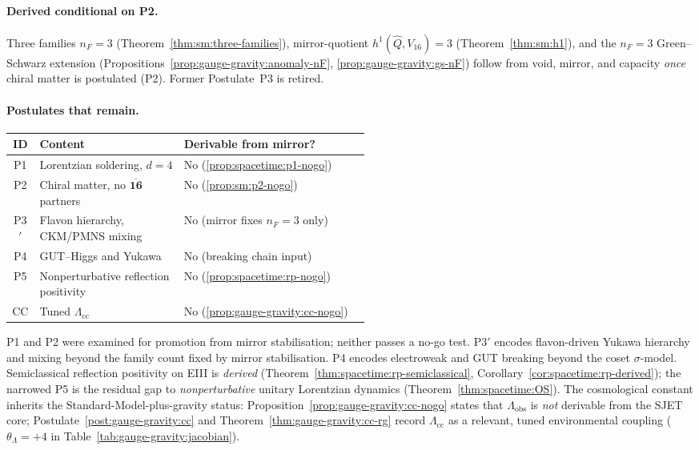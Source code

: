 \paragraph{Derived conditional on P2.}
Three families $n_F=3$ (Theorem~\ref{thm:sm:three-families}), mirror-quotient
$h^1(\hat Q,V_{16})=3$ (Theorem~\ref{thm:sm:h1}), and the $n_F=3$ Green--Schwarz
extension (Propositions~\ref{prop:gauge-gravity:anomaly-nF},
\ref{prop:gauge-gravity:gs-nF}) follow from void, mirror, and capacity
\emph{once} chiral matter is postulated (P2). Former Postulate~P3 is retired.

\paragraph{Postulates that remain.}
\begin{center}
\small
\renewcommand{\arraystretch}{1.1}
\begin{tabular}{@{}clp{0.52\linewidth}@{}}
\toprule
\textbf{ID} & \textbf{Content} & \textbf{Derivable from mirror?} \\
\midrule
P1 & Lorentzian soldering, $d=4$ & No (\ref{prop:spacetime:p1-nogo}) \\
P2 & Chiral matter, no $\overline{\mathbf{16}}$ partners & No (\ref{prop:sm:p2-nogo}) \\
P3$'$ & Flavon hierarchy, CKM/PMNS mixing & No (mirror fixes $n_F=3$ only) \\
P4 & GUT--Higgs and Yukawa & No (breaking chain input) \\
P5 & Nonperturbative reflection positivity & No (\ref{prop:spacetime:rp-nogo}) \\
CC & Tuned $\Lambda_{\mathrm{cc}}$ & No (\ref{prop:gauge-gravity:cc-nogo}) \\
\bottomrule
\end{tabular}
\end{center}
\noindent
P1 and P2 were examined for promotion from mirror stabilisation; neither
passes a no-go test. P3$'$ encodes flavon-driven Yukawa hierarchy and mixing beyond the family
count fixed by mirror stabilisation. P4 encodes electroweak and GUT breaking
beyond the coset $\sigma$-model. Semiclassical reflection positivity on EIII is
\emph{derived} (Theorem~\ref{thm:spacetime:rp-semiclassical},
Corollary~\ref{cor:spacetime:rp-derived}); the narrowed P5 is the residual
gap to \emph{nonperturbative} unitary Lorentzian dynamics
(Theorem~\ref{thm:spacetime:OS}). The cosmological constant inherits the
Standard-Model-plus-gravity status: Proposition~\ref{prop:gauge-gravity:cc-nogo}
states that $\Lambda_{\mathrm{obs}}$ is \emph{not} derivable from the SJET
core; Postulate~\ref{post:gauge-gravity:cc} and
Theorem~\ref{thm:gauge-gravity:cc-rg} record $\Lambda_{\mathrm{cc}}$ as a
relevant, tuned environmental coupling ($\theta_{\Lambda}=+4$ in
Table~\ref{tab:gauge-gravity:jacobian}).

